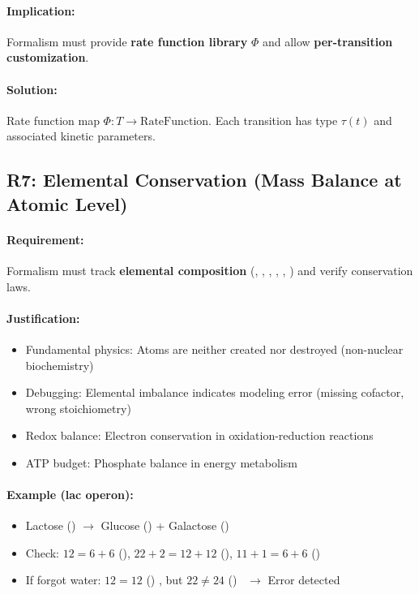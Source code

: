 \paragraph{Implication:} Formalism must provide \textbf{rate function library} $\Phi$ and allow \textbf{per-transition customization}.

\paragraph{Solution:} Rate function map $\Phi: T \to \text{RateFunction}$. Each transition has type $\tau(t)$ and associated kinetic parameters.

\subsection{R7: Elemental Conservation (Mass Balance at Atomic Level)}
\label{subsec:r7-conservation}

\paragraph{Requirement:} Formalism must track \textbf{elemental composition} (, , , , , ) and verify conservation laws.

\paragraph{Justification:}
\begin{itemize}
    \item Fundamental physics: Atoms are neither created nor destroyed (non-nuclear biochemistry)
    \item Debugging: Elemental imbalance indicates modeling error (missing cofactor, wrong stoichiometry)
    \item Redox balance: Electron conservation in oxidation-reduction reactions
    \item ATP budget: Phosphate balance in energy metabolism
\end{itemize}

\paragraph{Example (lac operon):}
\begin{itemize}
    \item Lactose () $\to$ Glucose () + Galactose ()
    \item Check: $12 = 6+6$ (), $22+2 = 12+12$ (), $11+1 = 6+6$ () \checkmark
    \item If forgot water: $12=12$ () \checkmark, but $22 \neq 24$ () \texttimes\ $\to$ Error detected
\end{itemize}

